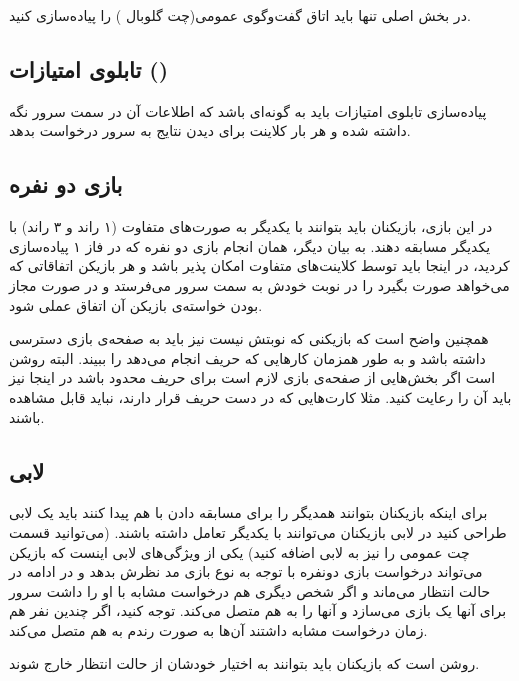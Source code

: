 \documentclass[]{article}
\begin{document}
در بخش اصلی تنها باید
اتاق گفت‌وگوی عمومی(چت گلوبال )
را پیاده‌سازی کنید.

\subsection*{{\titr تابلوی امتیازات ()}}

پیاده‌سازی تابلوی امتیازات باید به گونه‌ای باشد که اطلاعات آن در سمت سرور نگه داشته شده و هر بار کلاینت برای دیدن نتایج به سرور درخواست بدهد.

\subsection*{{\titr بازی دو نفره}}
در این بازی، بازیکنان باید بتوانند با یکدیگر به صورت‌های متفاوت (۱ راند و ۳ راند) با یکدیگر مسابقه دهند. به بیان دیگر، همان انجام بازی دو نفره که در فاز ۱ پیاده‌سازی کردید، در اینجا باید توسط کلاینت‌های متفاوت امکان پذیر باشد و هر بازیکن اتفاقاتی که می‌خواهد صورت بگیرد را در نوبت خودش به سمت سرور می‌فرستد و در صورت مجاز بودن خواسته‌ی بازیکن آن اتفاق عملی شود.

همچنین واضح است که بازیکنی که نوبتش نیست نیز باید به صفحه‌ی بازی دسترسی داشته باشد و به طور همزمان کارهایی که حریف انجام می‌دهد را ببیند. البته روشن است اگر بخش‌هایی از صفحه‌ی بازی لازم است برای حریف محدود باشد در اینجا نیز باید آن را رعایت کنید. مثلا کارت‌هایی که در دست حریف قرار دارند، نباید قابل مشاهده باشند.

\subsection*{{\titr لابی}}
برای اینکه بازیکنان بتوانند همدیگر را برای مسابقه دادن با هم پیدا کنند باید یک لابی طراحی کنید در لابی بازیکنان می‌توانند با یکدیگر تعامل داشته باشند. (می‌توانید قسمت چت عمومی را نیز به لابی اضافه کنید) یکی از ویژگی‌های لابی اینست که بازیکن می‌تواند درخواست بازی دونفره با توجه به نوع بازی مد نظرش بدهد و در ادامه در حالت انتظار می‌ماند و اگر شخص دیگری هم درخواست مشابه با او را داشت سرور برای آنها یک بازی می‌سازد و آنها را به هم متصل می‌کند. توجه کنید، اگر چندین نفر هم زمان درخواست مشابه داشتند آن‌ها به صورت رندم به هم متصل می‌کند.

روشن است که بازیکنان باید بتوانند به اختیار خودشان از حالت انتظار خارج شوند.
\end{document}
